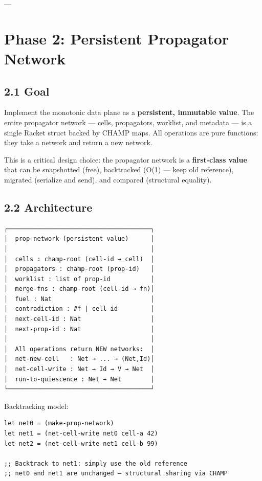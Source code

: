 \documentclass[11pt]{article}
\begin{document}
---
\section{Phase 2: Persistent Propagator Network}
\label{sec:org3a8c784}

\subsection{2.1 Goal}
\label{sec:org9a0fcec}

Implement the monotonic data plane as a \textbf{persistent, immutable value}.
The entire propagator network — cells, propagators, worklist, and
metadata — is a single Racket struct backed by CHAMP maps. All operations
are pure functions: they take a network and return a new network.

This is a critical design choice: the propagator network is a \textbf{first-class
value} that can be snapshotted (free), backtracked (O(1) — keep old
reference), migrated (serialize and send), and compared (structural equality).
\subsection{2.2 Architecture}
\label{sec:org11da473}

\begin{verbatim}
┌───────────────────────────────────────┐
│  prop-network (persistent value)      │
│                                       │
│  cells : champ-root (cell-id → cell)  │
│  propagators : champ-root (prop-id)   │
│  worklist : list of prop-id           │
│  merge-fns : champ-root (cell-id → fn)│
│  fuel : Nat                           │
│  contradiction : #f | cell-id         │
│  next-cell-id : Nat                   │
│  next-prop-id : Nat                   │
│                                       │
│  All operations return NEW networks:  │
│  net-new-cell   : Net → ... → (Net,Id)│
│  net-cell-write : Net → Id → V → Net  │
│  run-to-quiescence : Net → Net        │
└───────────────────────────────────────┘
\end{verbatim}

Backtracking model:
\begin{verbatim}
let net0 = (make-prop-network)
let net1 = (net-cell-write net0 cell-a 42)
let net2 = (net-cell-write net1 cell-b 99)

;; Backtrack to net1: simply use the old reference
;; net0 and net1 are unchanged — structural sharing via CHAMP
\end{verbatim}
\end{document}
